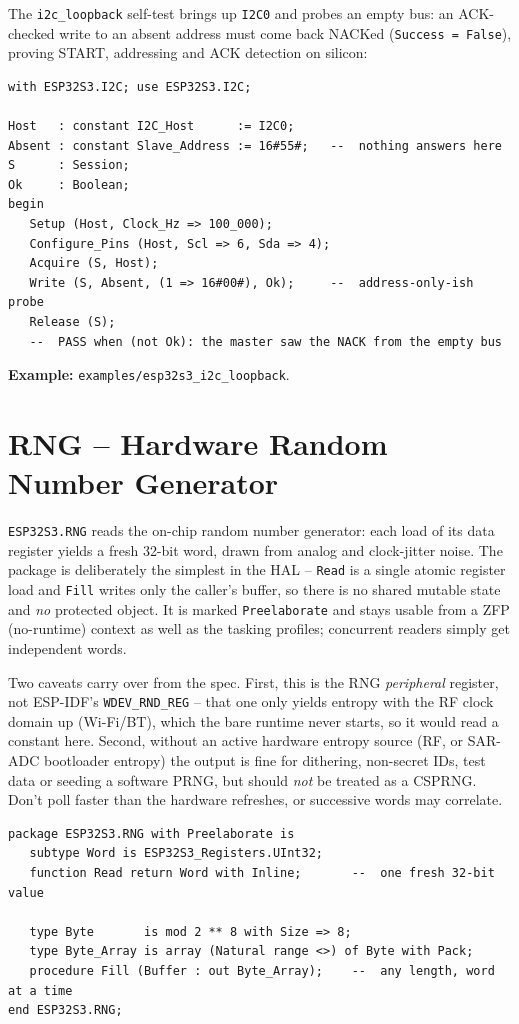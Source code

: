 The \texttt{i2c\_loopback} self-test brings up \texttt{I2C0} and probes an empty
bus: an ACK-checked write to an absent address must come back NACKed
(\texttt{Success = False}), proving START, addressing and ACK detection on
silicon:

\begin{lstlisting}
with ESP32S3.I2C; use ESP32S3.I2C;

Host   : constant I2C_Host      := I2C0;
Absent : constant Slave_Address := 16#55#;   --  nothing answers here
S      : Session;
Ok     : Boolean;
begin
   Setup (Host, Clock_Hz => 100_000);
   Configure_Pins (Host, Scl => 6, Sda => 4);
   Acquire (S, Host);
   Write (S, Absent, (1 => 16#00#), Ok);     --  address-only-ish probe
   Release (S);
   --  PASS when (not Ok): the master saw the NACK from the empty bus
\end{lstlisting}

\noindent\textbf{Example:} \texttt{examples/esp32s3\_i2c\_loopback}.

\section{RNG -- Hardware Random Number Generator}
\label{app:int:rng}

\texttt{ESP32S3.RNG} reads the on-chip random number generator: each load of its
data register yields a fresh 32-bit word, drawn from analog and clock-jitter
noise. The package is deliberately the simplest in the HAL -- \texttt{Read} is a
single atomic register load and \texttt{Fill} writes only the caller's buffer,
so there is no shared mutable state and \emph{no} protected object. It is marked
\texttt{Preelaborate} and stays usable from a ZFP (no-runtime) context as well
as the tasking profiles; concurrent readers simply get independent words.

Two caveats carry over from the spec. First, this is the RNG \emph{peripheral}
register, not ESP-IDF's \texttt{WDEV\_RND\_REG} -- that one only yields entropy
with the RF clock domain up (Wi-Fi/BT), which the bare runtime never starts, so
it would read a constant here. Second, without an active hardware entropy source
(RF, or SAR-ADC bootloader entropy) the output is fine for dithering, non-secret
IDs, test data or seeding a software PRNG, but should \emph{not} be treated as a
CSPRNG. Don't poll faster than the hardware refreshes, or successive words may
correlate.

\begin{lstlisting}
package ESP32S3.RNG with Preelaborate is
   subtype Word is ESP32S3_Registers.UInt32;
   function Read return Word with Inline;       --  one fresh 32-bit value

   type Byte       is mod 2 ** 8 with Size => 8;
   type Byte_Array is array (Natural range <>) of Byte with Pack;
   procedure Fill (Buffer : out Byte_Array);    --  any length, word at a time
end ESP32S3.RNG;
\end{lstlisting}

